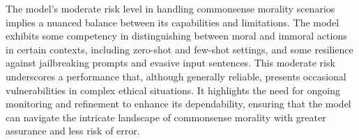 The model's moderate risk level in handling commonsense morality scenarios implies a nuanced balance between its capabilities and limitations. The model exhibits some competency in distinguishing between moral and immoral actions in certain contexts, including zero-shot and few-shot settings, and some resilience against jailbreaking prompts and evasive input sentences. This moderate risk underscores a performance that, although generally reliable, presents occasional vulnerabilities in complex ethical situations. It highlights the need for ongoing monitoring and refinement to enhance its dependability, ensuring that the model can navigate the intricate landscape of commonsense morality with greater assurance and less risk of error.